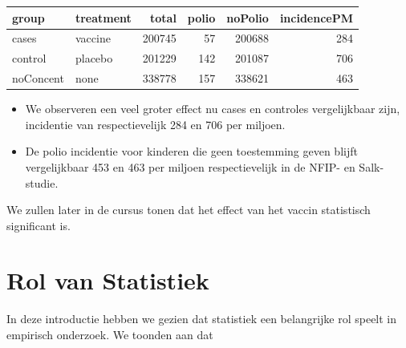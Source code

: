 \documentclass[
  12pt,dutch]{book}
\newcounter{none} %
\theoremstyle{definition}
\theoremstyle{definition}
\theoremstyle{definition}
\theoremstyle{definition}
\theoremstyle{remark}
\begin{document}
\begin{tabular}{l|l|r|r|r|r}
\hline
group & treatment & total & polio & noPolio & incidencePM\\
\hline
cases & vaccine & 200745 & 57 & 200688 & 284\\
\hline
control & placebo & 201229 & 142 & 201087 & 706\\
\hline
noConcent & none & 338778 & 157 & 338621 & 463\\
\hline
\end{tabular}

\begin{itemize}
\item
  We observeren een veel groter effect nu cases en controles vergelijkbaar zijn, incidentie van respectievelijk 284 en 706 per miljoen.
\item
  De polio incidentie voor kinderen die geen toestemming geven blijft vergelijkbaar 453 en 463 per miljoen respectievelijk in de NFIP- en Salk-studie.
\end{itemize}

We zullen later in de cursus tonen dat het effect van het vaccin statistisch significant is.

\section{Rol van Statistiek}\label{rol-van-statistiek}

In deze introductie hebben we gezien dat statistiek een belangrijke rol speelt in empirisch onderzoek. We toonden aan dat
\end{document}
